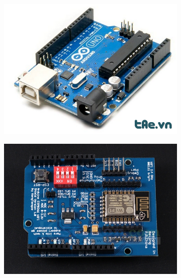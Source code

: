 \documentclass[a4paper,12pt]{report}
\begin{document}
\begin{figure}[h]
\begin{subfigure}{.3\textwidth}
  \centering
  \includegraphics[width=1\linewidth]{../uno.jpg}
  \label{fig:sfig1}
\end{subfigure}%
\begin{subfigure}{.3\textwidth}
  \centering
  \includegraphics[width=1\linewidth]{../esp.jpg}
  \label{fig:sfig2}
\end{subfigure}
\begin{subfigure}{.3\textwidth}
  \centering

\end{subfigure}
\end{figure}
\end{document}
